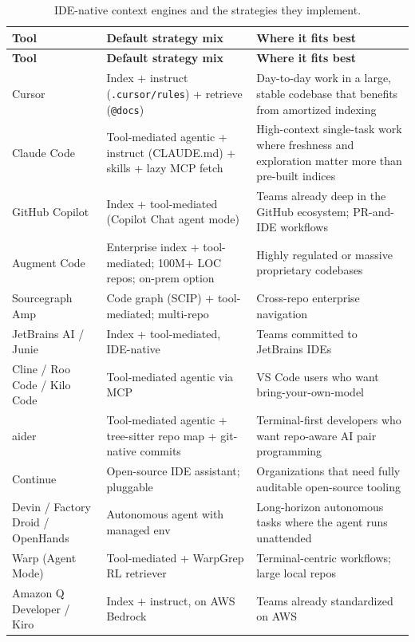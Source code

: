 \documentclass[
  11pt,
  letterpaper,
  numbers=noendperiod,
  parskip=half]{scrartcl}
\begin{document}
\begin{longtable}[]{@{}
  >{\raggedright\arraybackslash}p{}
  >{\raggedright\arraybackslash}p{}
  >{\raggedright\arraybackslash}p{}@{}}
\caption{IDE-native context engines and the strategies they
implement.}\label{tbl-tools-ide}\tabularnewline
\toprule\noalign{}
\textbf{Tool} & \textbf{Default strategy mix} & \textbf{Where it fits best}\\
\midrule\noalign{}
\endfirsthead
\toprule\noalign{}
\textbf{Tool} & \textbf{Default strategy mix} & \textbf{Where it fits best}\\
\midrule\noalign{}
\endhead
\bottomrule\noalign{}
\endlastfoot
Cursor & Index + instruct (\texttt{.cursor/rules}) + retrieve (\texttt{@docs}) & Day-to-day work in a large, stable codebase that benefits from amortized indexing\\
Claude Code & Tool-mediated agentic + instruct (CLAUDE.md) + skills + lazy MCP fetch & High-context single-task work where freshness and exploration matter more than pre-built indices\\
GitHub Copilot & Index + tool-mediated (Copilot Chat agent mode) & Teams already deep in the GitHub ecosystem; PR-and-IDE workflows\\
Augment Code & Enterprise index + tool-mediated; 100M+ LOC repos; on-prem option & Highly regulated or massive proprietary codebases\\
Sourcegraph Amp & Code graph (SCIP) + tool-mediated; multi-repo & Cross-repo enterprise navigation\\
JetBrains AI / Junie & Index + tool-mediated, IDE-native & Teams committed to JetBrains IDEs\\
Cline / Roo Code / Kilo Code & Tool-mediated agentic via MCP & VS Code users who want bring-your-own-model\\
aider & Tool-mediated agentic + tree-sitter repo map + git-native commits & Terminal-first developers who want repo-aware AI pair programming\\
Continue & Open-source IDE assistant; pluggable & Organizations that need fully auditable open-source tooling\\
Devin / Factory Droid / OpenHands & Autonomous agent with managed env & Long-horizon autonomous tasks where the agent runs unattended\\
Warp (Agent Mode) & Tool-mediated + WarpGrep RL retriever & Terminal-centric workflows; large local repos\\
Amazon Q Developer / Kiro & Index + instruct, on AWS Bedrock & Teams already standardized on AWS\\
\end{longtable}
\end{document}
